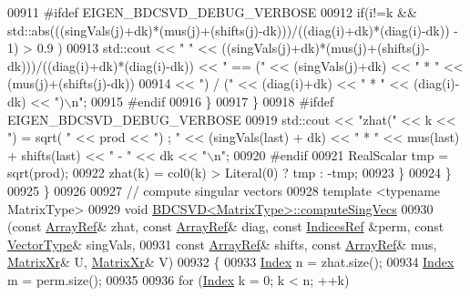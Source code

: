 \begin{DoxyCode}
00911 \textcolor{preprocessor}{#ifdef EIGEN\_BDCSVD\_DEBUG\_VERBOSE}
00912           \textcolor{keywordflow}{if}(i!=k && std::abs(((singVals(j)+dk)*(mus(j)+(shifts(j)-dk)))/((diag(i)+dk)*(diag(i)-dk)) - 1) >
       0.9 )
00913             std::cout << \textcolor{stringliteral}{"     "} << ((singVals(j)+dk)*(mus(j)+(shifts(j)-dk)))/((diag(i)+dk)*(diag(i)-dk)) 
      << \textcolor{stringliteral}{" == ("} << (singVals(j)+dk) << \textcolor{stringliteral}{" * "} << (mus(j)+(shifts(j)-dk))
00914                        << \textcolor{stringliteral}{") / ("} << (diag(i)+dk) << \textcolor{stringliteral}{" * "} << (diag(i)-dk) << \textcolor{stringliteral}{")\(\backslash\)n"};
00915 \textcolor{preprocessor}{#endif}
00916         \}
00917       \}
00918 \textcolor{preprocessor}{#ifdef EIGEN\_BDCSVD\_DEBUG\_VERBOSE}
00919       std::cout << \textcolor{stringliteral}{"zhat("} << k << \textcolor{stringliteral}{") =  sqrt( "} << prod << \textcolor{stringliteral}{")  ;  "} << (singVals(last) + dk) << \textcolor{stringliteral}{" * "} << 
      mus(last) + shifts(last) << \textcolor{stringliteral}{" - "} << dk << \textcolor{stringliteral}{"\(\backslash\)n"};
00920 \textcolor{preprocessor}{#endif}
00921       RealScalar tmp = sqrt(prod);
00922       zhat(k) = col0(k) > Literal(0) ? tmp : -tmp;
00923     \}
00924   \}
00925 \}
00926 
00927 \textcolor{comment}{// compute singular vectors}
00928 \textcolor{keyword}{template} <\textcolor{keyword}{typename} MatrixType>
00929 \textcolor{keywordtype}{void} \hyperlink{group___s_v_d___module_class_eigen_1_1_b_d_c_s_v_d}{BDCSVD<MatrixType>::computeSingVecs}
00930    (\textcolor{keyword}{const} \hyperlink{group___core___module_class_eigen_1_1_ref}{ArrayRef}& zhat, \textcolor{keyword}{const} \hyperlink{group___core___module_class_eigen_1_1_ref}{ArrayRef}& diag, \textcolor{keyword}{const} \hyperlink{group___core___module_class_eigen_1_1_ref}{IndicesRef} &perm, \textcolor{keyword}{const} 
      \hyperlink{group___core___module}{VectorType}& singVals,
00931     \textcolor{keyword}{const} \hyperlink{group___core___module_class_eigen_1_1_ref}{ArrayRef}& shifts, \textcolor{keyword}{const} \hyperlink{group___core___module_class_eigen_1_1_ref}{ArrayRef}& mus, \hyperlink{group___core___module}{MatrixXr}& U, 
      \hyperlink{group___core___module}{MatrixXr}& V)
00932 \{
00933   \hyperlink{namespace_eigen_a62e77e0933482dafde8fe197d9a2cfde}{Index} n = zhat.size();
00934   \hyperlink{namespace_eigen_a62e77e0933482dafde8fe197d9a2cfde}{Index} m = perm.size();
00935   
00936   \textcolor{keywordflow}{for} (\hyperlink{namespace_eigen_a62e77e0933482dafde8fe197d9a2cfde}{Index} k = 0; k < n; ++k)

\end{DoxyCode}
